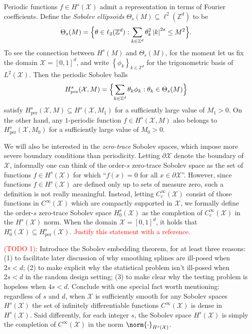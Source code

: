 \documentclass{article}
\newcommand{\abs}[1]{\left \lvert #1 \right \rvert}
\newcommand{\set}[1]{\left\{#1\right\}}
\newcommand{\1}{\mathbf{1}}
\newcommand{\Xset}{\mathcal{X}}
\newcommand{\Leb}{L}
\theoremstyle{alden}
\theoremstyle{aldenthm}
\theoremstyle{definition}
\theoremstyle{remark}
\begin{document}
Periodic functions $f \in H^s(\Xset)$ admit a representation in terms of Fourier coefficients. Define the \emph{Sobolev ellipsoids} $\Theta_s(M) \subseteq \ell^2(\mathbb{Z}^d)$ to be
\begin{equation*}
\Theta_s(M) = \Bigl\{\theta \in \ell_2(\mathbb{Z}^d): \sum_{k \in \mathbb{Z}^d} \theta_k^2 \abs{k}^{2s} \leq M^2\Bigr\}.
\end{equation*}
To see the connection between $H^s(M)$ and $\Theta_s(M)$, for the moment let us fix the domain $\Xset = [0,1]^d$, and write $\set{\phi_k}_{k \in \mathbb{Z}^d}$ for the trigonometric basis of $\Leb^2(\Xset)$. Then the periodic Sobolev balls
\begin{equation*}
H_{\textrm{per}}^s(\Xset,M) = \Bigl\{\sum_{k \in \mathbb{Z}^d} \theta_k \phi_k: \theta_k \in \Theta_s(M) \Bigr\}
\end{equation*}
satisfy $H_{\textrm{per}}^s(\Xset,M) \subseteq H^s(\Xset,M_1)$ for a sufficiently large value of $M_1 > 0$. On the other hand, any $1$-periodic function $f \in H^s(\Xset,M)$ also belongs to $H_{\textrm{per}}^s(\Xset,M_0)$ for a sufficiently large value of $M_0 > 0$.

We will also be interested in the \emph{zero-trace} Sobolev spaces, which impose more severe boundary conditions than periodicity. Letting $\partial \Xset$ denote the boundary of $\Xset$, informally one can think of the order-$s$ zero-trace Sobolev space as the set of functions $f \in H^s(\Xset)$ for which ``$f(x) = 0$ for all $x \in \partial\Xset$''. However, since functions $f \in H^s(\Xset)$ are defined only up to sets of measure zero, such a definition is not really meaningful. Instead, letting $C_c^{\infty}(\Xset)$ consist of those functions in $C^{\infty}(\Xset)$ which are compactly supported in $\Xset$, we formally define the order-$s$ zero-trace Sobolev space $H_0^{s}(\Xset)$ as the completion of $C_c^{\infty}(\Xset)$ in the $H^{s}(\Xset)$ norm. When the domain $\Xset = [0,1]^d$, it holds that $H_0^{s}(\Xset) \subseteq H_{\textrm{per}}^{s}(\Xset)$. \textcolor{red}{Justify this statement with a reference.}

\textcolor{red}{(TODO 1)}: Introduce the Sobolev embedding theorem, for at least three reasons: (1) to facilitate later discussion of why smoothing splines are ill-posed when $2s < d$; (2) to make explicit why the statistical problem isn't ill-posed when $2s < d$ in the random design setting; (3) to make clear why the testing problem is hopeless when $4s < d$. Conclude with one special fact worth mentioning: regardless of $s$ and $d$, when $\Xset$ is sufficiently smooth for any Sobolev spaces $H^s(\Xset)$ the set of infinitely differentiable functions $C^{\infty}(\Xset)$ is dense in $H^s(\Xset)$. Said differently, for each integer $s$, the Sobolev space $H^s(\Xset)$ is simply the completion of $C^{\infty}(\Xset)$ in the norm $\norm{\cdot}_{H^s(\Xset)}$.
\end{document}
